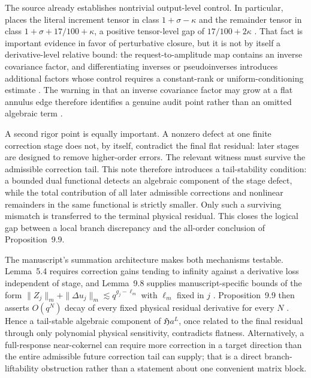 \documentclass[12pt]{article}
\theoremstyle{plain}
\theoremstyle{definition}
\theoremstyle{remark}
\newcommand{\Hidden}{\mathfrak H}
\begin{document}
The source already establishes nontrivial output-level control. In particular,  places the literal increment tensor in class \(1+\sigma-\kappa\) and the remainder tensor in class \(1+\sigma+17/100+\kappa\), a positive tensor-level gap of \(17/100+2\kappa\) \cite{OpenAILeanRepo2026}. That fact is important evidence in favor of perturbative closure, but it is not by itself a derivative-level relative bound: the request-to-amplitude map contains an inverse covariance factor, and differentiating inverses or pseudoinverses introduces additional factors whose control requires a constant-rank or uniform-conditioning estimate \cite{GolubPereyra1973,StewartSun1990}. The warning in  that an inverse covariance factor may grow at a flat annulus edge therefore identifies a genuine audit point rather than an omitted algebraic term \cite{OpenAILeanRepo2026}.

A second rigor point is equally important. A nonzero defect at one finite correction stage does not, by itself, contradict the final flat residual: later stages are designed to remove higher-order errors. The relevant witness must survive the admissible correction tail. This note therefore introduces a tail-stability condition: a bounded dual functional detects an algebraic component of the stage defect, while the total contribution of all later admissible corrections and nonlinear remainders in the same functional is strictly smaller. Only such a surviving mismatch is transferred to the terminal physical residual. This closes the logical gap between a local branch discrepancy and the all-order conclusion of Proposition~9.9.

The manuscript's summation architecture makes both mechanisms testable. Lemma~5.4 requires correction gains tending to infinity against a derivative loss independent of stage, and Lemma~9.8 supplies manuscript-specific bounds of the form \(\|Z_j\|_m+\|\Delta u_j\|_m\lesssim q^{g_j-\ell_m}\) with \(\ell_m\) fixed in \(j\) \cite[Lemmas~5.4 and 9.8]{OpenAI2026}. Proposition~9.9 then asserts \(O(q^N)\) decay of every fixed physical residual derivative for every \(N\) \cite[Prop.~9.9]{OpenAI2026}. Hence a tail-stable algebraic component of \(\Hidden a^L\), once related to the final residual through only polynomial physical sensitivity, contradicts flatness. Alternatively, a full-response near-cokernel can require more correction in a target direction than the entire admissible future correction tail can supply; that is a direct branch-liftability obstruction rather than a statement about one convenient matrix block.
\end{document}
